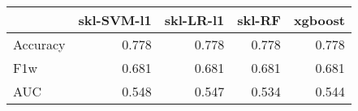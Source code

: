 \begin{tabular}{lrrrr}
\toprule
{} &  skl-SVM-l1 &  skl-LR-l1 &  skl-RF &  xgboost \\
\midrule
Accuracy &       0.778 &      0.778 &   0.778 &    0.778 \\
F1w      &       0.681 &      0.681 &   0.681 &    0.681 \\
AUC      &       0.548 &      0.547 &   0.534 &    0.544 \\
\bottomrule
\end{tabular}
